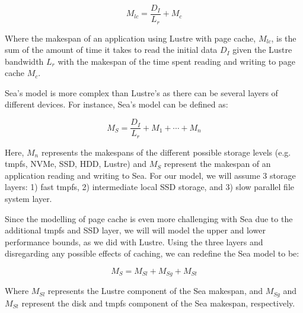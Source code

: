       \begin{equation}\label{eq:lustrepc}
          M_{lc} = \frac{D_{I}}{L_{r}} + M_{c}
      \end{equation}

      Where the makespan of an application using Lustre with page cache, $M_{lc}$, is
      the sum of the amount of time it takes to read the initial data $D_{I}$ given the 
      Lustre bandwidth $L_{r}$ with the makespan of the time spent reading and writing to 
      page cache $M_{c}$.


      Sea's model is more complex than Lustre's as there can be several layers
      of different devices. For instance, Sea's model can be defined as:

      \begin{equation}\label{eq:sea}
          M_{S} = \frac{D_{I}}{L_{r}} + M_{1} + \cdots + M_{n}
      \end{equation}

      Here, $M_{n}$ represents the makespans of the different possible storage
      levels (e.g. tmpfs, NVMe, SSD, HDD, Lustre) and $M_{S}$ represent the makespan
      of an application reading and writing to Sea. For our model, we will assume
      3 storage layers: 1) fast tmpfs, 2) intermediate local SSD storage, and 3)
      slow parallel file system layer.

      Since the modelling of page cache is even more challenging with Sea due to
      the additional tmpfs and SSD layer, we will will model the upper and lower
      performance bounds, as we did with Lustre. Using the three layers and
      disregarding any possible effects of caching, we can redefine the Sea
      model to be:

      \begin{equation}\label{eq:snc}
          M_{S} = M_{Sl} + M_{Sg} + M_{St}
      \end{equation}

         Where $M_{Sl}$ represents the Lustre component of the Sea makespan, and
      $M_{Sg}$ and $M_{St}$ represent the disk and tmpfs component of the Sea
      makespan, respectively.

